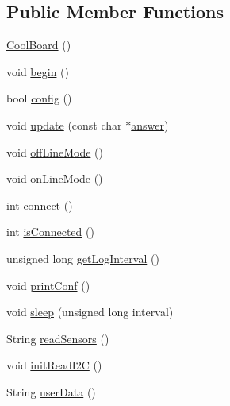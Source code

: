 \subsection*{Public Member Functions}
\begin{DoxyCompactItemize}
\item 
\hyperlink{class_cool_board_a8b88fd781e22e93025dd63474113b7e4}{Cool\+Board} ()
\item 
void \hyperlink{class_cool_board_acba7c5aef7268b2c0044bdb54d3b9d76}{begin} ()
\item 
bool \hyperlink{class_cool_board_a583a874c09c07e70a6eb9229fc4beddb}{config} ()
\item 
void \hyperlink{class_cool_board_a8612756d3f73198cdde857a66f0fe690}{update} (const char $\ast$\hyperlink{class_cool_board_a7b835fafd449e5282f7f91d787a2dc15}{answer})
\item 
void \hyperlink{class_cool_board_ae6b5e1274d760462290192acea4adca8}{off\+Line\+Mode} ()
\item 
void \hyperlink{class_cool_board_aa0bbc4bc605e35618d18e68795c61363}{on\+Line\+Mode} ()
\item 
int \hyperlink{class_cool_board_a519de78b807f8ec6463ff484eb925918}{connect} ()
\item 
int \hyperlink{class_cool_board_ad7442cf4b62c7b0d5bd62a0f75ffc065}{is\+Connected} ()
\item 
unsigned long \hyperlink{class_cool_board_a7508e029f2ee17bb747ffab599285e0d}{get\+Log\+Interval} ()
\item 
void \hyperlink{class_cool_board_a486507b8f0981d3cc671ed31c2145755}{print\+Conf} ()
\item 
void \hyperlink{class_cool_board_a069952cdcb2e7f68518aa429eceadb6e}{sleep} (unsigned long interval)
\item 
String \hyperlink{class_cool_board_ad03abdce2e65f520bbf2cff0f2d083cf}{read\+Sensors} ()
\item 
void \hyperlink{class_cool_board_a397b46fadab8f530a8cf4d914c561366}{init\+Read\+I2C} ()
\item 
String \hyperlink{class_cool_board_ae7358fb6e623cfc81b775f5f1734909b}{user\+Data} ()
\end{DoxyCompactItemize}
